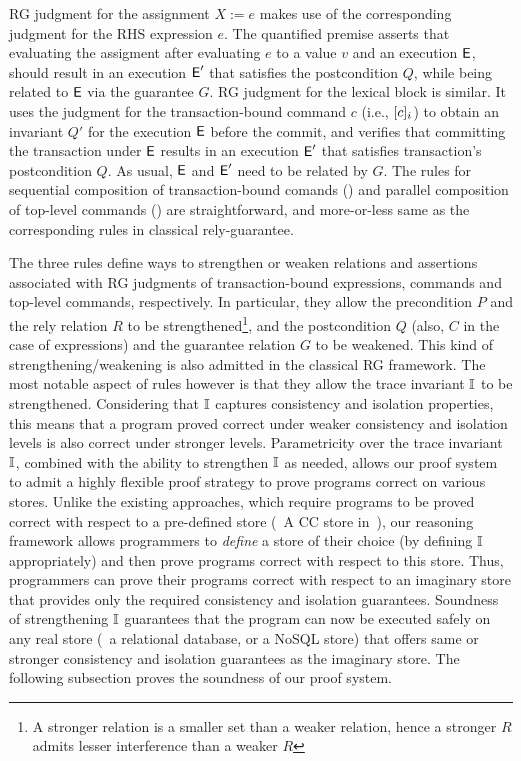 RG judgment for the assignment $X:=e$ makes use of the corresponding
judgment for the RHS expression $e$. The quantified premise asserts
that evaluating the assigment after evaluating $e$ to a value $v$ and
an execution $\textsf{E}$, should result in an execution $\textsf{E}'$ that satisfies
the postcondition $Q$, while being related to $\textsf{E}$ via the guarantee
$G$. RG judgment for the  lexical block is similar.  It uses
the judgment for the transaction-bound command $c$ (i.e.,
$\lbrack c \rbrack_i$) to obtain an invariant $Q'$ for the execution $\textsf{E}$
before the commit, and verifies that committing the transaction under
$\textsf{E}$ results in an execution $\textsf{E}'$ that satisfies transaction's
postcondition $Q$. As usual, $\textsf{E}$ and $\textsf{E}'$ need to be related by $G$.
The rules for sequential composition of transaction-bound comands
() and parallel composition of top-level commands
() are straightforward, and more-or-less same as the
corresponding rules in classical rely-guarantee.

The three  rules define ways to strengthen or
weaken relations and assertions associated with RG judgments of
transaction-bound expressions, commands and top-level commands,
respectively. In particular, they allow the precondition $P$ and the
rely relation $R$ to be strengthened\footnote{A stronger relation is a
smaller set than a weaker relation, hence a stronger $R$ admits lesser
interference than a weaker $R$}, and the postcondition $Q$ (also, $C$
in the case of expressions) and the guarantee relation $G$ to be
weakened. This kind of strengthening/weakening is also admitted in the
classical RG framework. The most notable aspect of
 rules however is that they allow the trace
invariant $\mathbb{I}$ to be strengthened. Considering that $\mathbb{I}$ captures
consistency and isolation properties, this means that a program proved
correct under weaker consistency and isolation levels is also correct
under stronger levels.  Parametricity over the trace invariant $\mathbb{I}$,
combined with the ability to strengthen $\mathbb{I}$ as needed, allows our
proof system to admit a highly flexible proof strategy to prove
programs correct on various stores. Unlike the existing approaches,
which require programs to be proved correct with respect to a
pre-defined store (\eg~A CC store in~\cite{gotsmanpopl16}), our
reasoning framework allows programmers to \emph{define} a store of
their choice (by defining $\mathbb{I}$ appropriately) and then prove programs
correct with respect to this store. Thus, programmers can prove their
programs correct with respect to an imaginary store that provides only
the required consistency and isolation guarantees. Soundness of
strengthening $\mathbb{I}$ guarantees that the program can now be executed
safely on any real store (\eg~a relational database, or a NoSQL store)
that offers same or stronger consistency and isolation guarantees as
the imaginary store. The following subsection proves the soundness of
our proof system.


